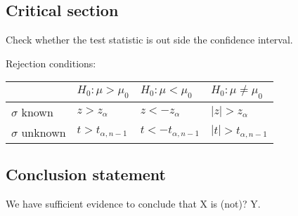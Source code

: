 \documentclass{article}
\begin{document}
\begin{multicols*}{2}
\subsection{Critical section}

Check whether the test statistic is out side the confidence interval.

Rejection conditions:
\begin{center}
    \begin{tabular}{|l|l|l|l|}
        \hline
                         & $H_0: \mu > \mu_0$        & $H_0: \mu < \mu_0$         & $H_0: \mu \neq \mu_0$     \\ \hline
        $\sigma$ known   & $z > z_\alpha$            & $z < -z_\alpha$            & $|z| > z_\alpha$          \\ \hline
        $\sigma$ unknown & $t > t_{\alpha, n - 1}$   & $t < -t_{\alpha, n - 1}$   & $|t| > t_{\alpha, n - 1}$ \\ \hline
    \end{tabular}
\end{center}

\subsection{Conclusion statement}

We have sufficient evidence to conclude that X is (not)? Y.

\end{multicols*}
\end{document}
